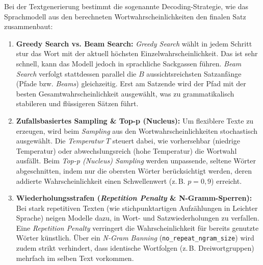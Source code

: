Bei der Textgenerierung bestimmt die sogenannte Decoding-Strategie, wie das Sprachmodell aus den berechneten Wortwahrscheinlichkeiten den finalen Satz zusammenbaut:
\begin{enumerate}
    \item \textbf{Greedy Search vs. Beam Search:} \textit{Greedy Search} wählt in jedem Schritt stur das Wort mit der aktuell höchsten Einzelwahrscheinlichkeit. Das ist sehr schnell, kann das Modell jedoch in sprachliche Sackgassen führen. \textit{Beam Search} verfolgt stattdessen parallel die $B$ aussichtsreichsten Satzanfänge (Pfade bzw. \textit{Beams}) gleichzeitig. Erst am Satzende wird der Pfad mit der besten Gesamtwahrscheinlichkeit ausgewählt, was zu grammatikalisch stabileren und flüssigeren Sätzen führt.
    \item \textbf{Zufallsbasiertes Sampling \& Top-p (Nucleus):} Um flexiblere Texte zu erzeugen, wird beim \textit{Sampling} aus den Wortwahrscheinlichkeiten stochastisch ausgewählt. Die \textit{Temperatur} $T$ steuert dabei, wie vorhersehbar (niedrige Temperatur) oder abwechslungsreich (hohe Temperatur) die Wortwahl ausfällt. Beim \textit{Top-p (Nucleus) Sampling} werden unpassende, seltene Wörter abgeschnitten, indem nur die obersten Wörter berücksichtigt werden, deren addierte Wahrscheinlichkeit einen Schwellenwert (z.\,B. $p = 0{,}9$) erreicht.
    \item \textbf{Wiederholungsstrafen (\textit{Repetition Penalty} \& N-Gramm-Sperren):} Bei stark repetitiven Texten (wie stichpunktartigen Aufzählungen in Leichter Sprache) neigen Modelle dazu, in Wort- und Satzwiederholungen zu verfallen. Eine \textit{Repetition Penalty} verringert die Wahrscheinlichkeit für bereits genutzte Wörter künstlich. Über ein \textit{N-Gram Banning} (\texttt{no\_repeat\_ngram\_size}) wird zudem strikt verhindert, dass identische Wortfolgen (z.\,B. Dreiwortgruppen) mehrfach im selben Text vorkommen.
\end{enumerate}

